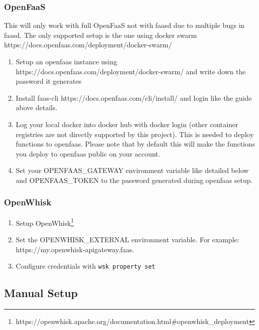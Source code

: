 \documentclass[../main.tex]{subfiles}
\begin{document}
\subsubsection{OpenFaaS}\label{sec:providersetupazure}
This will only work with full OpenFaaS not with faasd due to multiple bugs in faasd.
The only supported setup is the one using docker swarm https://docs.openfaas.com/deployment/docker-swarm/
\begin{enumerate}
\item Setup an openfaas instance using https://docs.openfaas.com/deployment/docker-swarm/ and write down the password it generates
\item Install faas-cli https://docs.openfaas.com/cli/install/ and login like the guide above details.
\item Log your local docker into docker hub with docker login (other container registries are not directly supported by this project).
This is needed to deploy functions to openfaas. Please note that by default this will make the functions you deploy to openfaas public on your account.
\item Set your OPENFAAS\_GATEWAY environment variable like detailed below and OPENFAAS\_TOKEN to the password generated during openfaas setup.
\end{enumerate}

\subsubsection{OpenWhisk}\label{sec:providersetupopenwhisk}

\begin{enumerate}
\item Setup OpenWhisk\footnote{https://openwhisk.apache.org/documentation.html\#openwhisk_deployment}
\item Set the OPENWHISK\_EXTERNAL environment variable. For example: https://my.openwhisk-apigateway.faas.
\item Configure credentials with \texttt{wsk property set}
\end{enumerate}

\subsection{Manual Setup}\label{sec:manualsetup}
\end{document}
